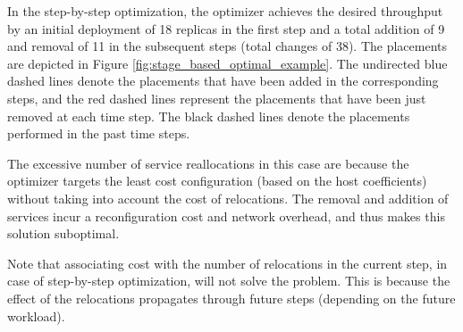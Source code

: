  In the step-by-step optimization, the optimizer achieves the desired throughput by an initial deployment of 18 replicas in the first step and a total addition of 9 and removal of 11 in the subsequent steps (total changes of 38). The placements are depicted in Figure \ref{fig:stage_based_optimal_example}. 
The undirected blue dashed lines denote the placements that have been added in the corresponding steps, and the red dashed lines represent the placements that have been just removed at each time step. The black dashed lines denote the placements performed in the past time steps. 

The excessive number of service reallocations in this case are because the optimizer targets the least cost configuration (based on the host coefficients) without taking into account the cost of relocations. The removal and addition of services incur a reconfiguration cost and network overhead, and thus makes this solution suboptimal. 

Note that associating cost with the number of relocations in the current step, in case of step-by-step optimization, will not solve the problem.  This is because the effect of the relocations propagates through future steps (depending on the future workload). 

